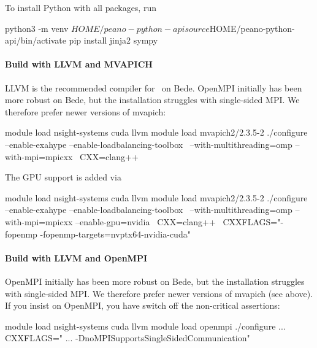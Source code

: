 To install Python with all packages, run
\begin{code}
python3 -m venv $HOME/peano-python-api
source $HOME/peano-python-api/bin/activate
pip install jinja2 sympy
\end{code}


\paragraph{Build with LLVM and MVAPICH}


LLVM is the recommended compiler for \Peano\ on Bede. 
OpenMPI initially has been more robust on Bede, but the installation struggles
with single-sided MPI. 
We therefore prefer newer versions of mvapich:

\begin{code}
module load nsight-systems cuda llvm
module load mvapich2/2.3.5-2 
./configure --enable-exahype --enable-loadbalancing-toolbox \
 --with-multithreading=omp  --with-mpi=mpicxx \
 CXX=clang++
\end{code}

\noindent
The GPU support is added via 
\begin{code}
module load nsight-systems cuda llvm
module load mvapich2/2.3.5-2 
./configure --enable-exahype --enable-loadbalancing-toolbox \
 --with-multithreading=omp  --with-mpi=mpicxx --enable-gpu=nvidia \
 CXX=clang++ \
 CXXFLAGS="-fopenmp -fopenmp-targets=nvptx64-nvidia-cuda"
\end{code}


 

  

\paragraph{Build with LLVM and OpenMPI}

OpenMPI initially has been more robust on Bede, but the installation struggles
with single-sided MPI. 
We therefore prefer newer versions of mvapich (see above).
If you insist on OpenMPI, you have switch off the non-critical assertions:

\begin{code}
module load nsight-systems cuda llvm
module load openmpi
./configure ... CXXFLAGS=" ... -DnoMPISupportsSingleSidedCommunication"
\end{code}

